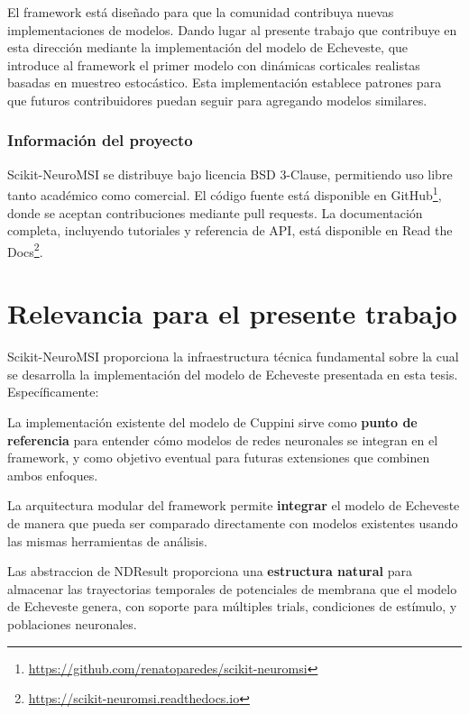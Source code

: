 El framework está diseñado para que la comunidad contribuya nuevas implementaciones de modelos. Dando lugar al presente trabajo que contribuye en esta dirección mediante la implementación del modelo de Echeveste, que introduce al framework el primer modelo con dinámicas corticales realistas basadas en muestreo estocástico. Esta implementación establece patrones para que futuros contribuidores puedan seguir para agregando modelos similares.

\subsubsection{Información del proyecto}
\label{subsec:snmsi_info}

Scikit-NeuroMSI se distribuye bajo licencia BSD 3-Clause, permitiendo uso libre tanto académico como comercial. El código fuente está disponible en GitHub\footnote{\url{https://github.com/renatoparedes/scikit-neuromsi}}, donde se aceptan contribuciones mediante pull requests. La documentación completa, incluyendo tutoriales y referencia de API, está disponible en Read the Docs\footnote{\url{https://scikit-neuromsi.readthedocs.io}}.


\section{Relevancia para el presente trabajo}
\label{sec:snmsi_relevancia}

Scikit-NeuroMSI proporciona la infraestructura técnica fundamental sobre la cual se desarrolla la implementación del modelo de Echeveste presentada en esta tesis. Específicamente:

La implementación existente del modelo de Cuppini sirve como \textbf{punto de referencia} para entender cómo modelos de redes neuronales se integran en el framework, y como objetivo eventual para futuras extensiones que combinen ambos enfoques.

La arquitectura modular del framework permite \textbf{integrar} el modelo de Echeveste de manera que pueda ser comparado directamente con modelos existentes usando las mismas herramientas de análisis.

Las abstraccion de NDResult proporciona una \textbf{estructura natural} para almacenar las trayectorias temporales de potenciales de membrana que el modelo de Echeveste genera, con soporte para múltiples trials, condiciones de estímulo, y poblaciones neuronales.


